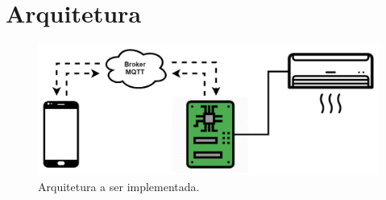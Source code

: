 \chapter{Arquitetura}
\label{chapter:arquitetura_requisitos}

\begin{figure}[H]
	\centering
	\includegraphics[width=0.8\columnwidth]{figuras/Architecture_Block_Diagram}
	\caption{Arquitetura a ser implementada.}
	\label{fig:Architecture_Block_Diagram}
\end{figure}
